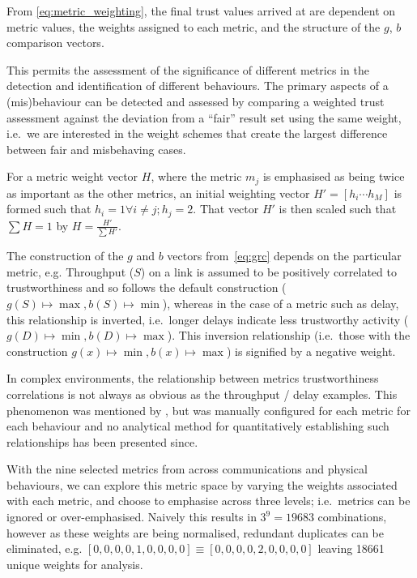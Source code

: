 From \eqref{eq:metric_weighting}, the final trust values arrived at are dependent on metric values, the weights assigned to each metric, and the structure of the $g$, $b$ comparison vectors.

This permits the assessment of the significance of different metrics in the detection and identification of different behaviours. 
The primary aspects of a (mis)behaviour can be detected and assessed by comparing a weighted trust assessment against the deviation from a ``fair'' result set using the same weight, i.e.\ we are interested in the weight schemes that create the largest difference between fair and misbehaving cases.

For a metric weight vector $H$, where the metric $m_j$ is emphasised as being twice as important as the other metrics, an initial weighting vector $H'=[h_i\cdots h_M]$ is formed such that $h_i = 1 \forall i \ne j; h_j=2$. That vector $H'$ is then scaled such that $\sum H = 1$ by $H= \frac{H'}{\sum H'}$.

The construction of the $g$ and $b$ vectors from~\eqref{eq:grc} depends on the particular metric, e.g. Throughput ($S$) on a link is assumed to be positively correlated to trustworthiness and so follows the default construction ($g(S) \mapsto \max, b(S) \mapsto \min$), whereas in the case of a metric such as delay, this relationship is inverted, i.e.\ longer delays indicate less trustworthy activity ($g(D) \mapsto \min, b(D) \mapsto \max$).
This inversion relationship (i.e.\ those with the construction $g(x) \mapsto \min, b(x) \mapsto \max$) is signified by a negative weight.

In complex environments, the relationship between metrics trustworthiness correlations is not always as obvious as the throughput / delay examples.
This phenomenon was mentioned by \citet{Guo2012}, but was manually configured for each metric for each behaviour and no analytical method for quantitatively establishing such relationships has been presented since.

With the nine selected metrics from across communications and physical behaviours, we can explore this metric space by varying the weights associated with each metric, and choose to emphasise across three levels; i.e.\ metrics can be ignored or over-emphasised. Naively this results in $3^9 = 19683$ combinations, however as these weights are being normalised, redundant duplicates can be eliminated, e.g. $[0,0,0,0,1,0,0,0,0] \equiv [0,0,0,0,2,0,0,0,0]$ leaving 18661 unique weights for analysis.

